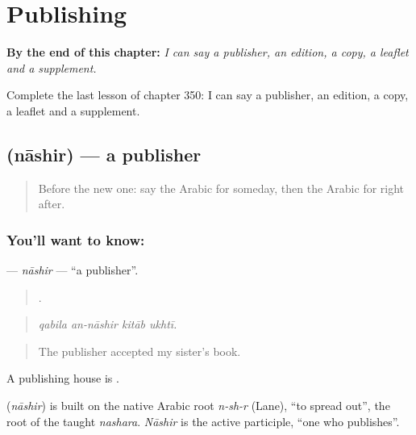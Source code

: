 
\chapter{Publishing}
\label{ch:ar-publishing}

\begin{chapteropening}
\textbf{By the end of this chapter:} \emph{I can say a publisher, an edition, a copy, a leaflet and a supplement.}

Complete the last lesson of chapter 350: I can say a publisher, an edition, a copy, a leaflet and a supplement.
\end{chapteropening}

\section[\texorpdfstring{\ar{ناشر} (nāshir)}{ناشر (nāshir)}]{ (nāshir) — a publisher}

\label{lesson:AR-C350-nashir}



\begin{quote}
Before the new one: say the Arabic for someday, then the Arabic for right after.
\end{quote}

\subsection*{You'll want to know: }
\textbf{} — \emph{nāshir} — \textquotedblleft{}a publisher\textquotedblright{}.

\begin{quote}
   .
\end{quote}

\begin{quote}
\emph{qabila an-nāshir kitāb ukhtī.}
\end{quote}

\begin{quote}
The publisher accepted my sister’s book.
\end{quote}

A publishing house is  .

\begin{cousinweb}
\textbf{} (\emph{nāshir}) is built on the native Arabic root \emph{n-sh-r} (Lane), \textquotedblleft{}to spread out\textquotedblright{}, the root of the taught \emph{nashara}. \emph{Nāshir} is the active participle, \textquotedblleft{}one who publishes\textquotedblright{}.
\end{cousinweb}

